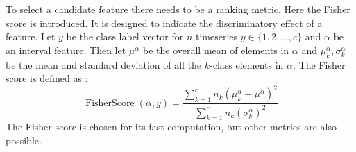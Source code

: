 To select a candidate feature there needs to be a ranking metric. 
Here the Fisher score is introduced. It is designed to indicate
the discriminatory effect of a feature. Let $y$ be 
the class label vector for $n$ timeseries $y \in \{1,2,\dots,c\}$ and 
$\alpha$ be an interval feature. Then let $\mu^{\alpha}$ be the overall mean of elements in $\alpha$ and $\mu^{\alpha}_k, \sigma^{\alpha}_k$ be the mean and standard
deviation of all the $k$-class elements in $\alpha$. 
The Fisher score is defined as :
\[
  \operatorname{FisherScore}(\alpha, y) = 
  \frac{\sum_{k = 1}^c n_k\left(\mu_k^{\alpha} - \mu^{\alpha}\right)^2}
       {\sum_{k = 1}^{c} n_k\left(\sigma_k^{\alpha}\right)^2}
\]
The Fisher score is chosen for its fast computation, but other metrics are also possible.